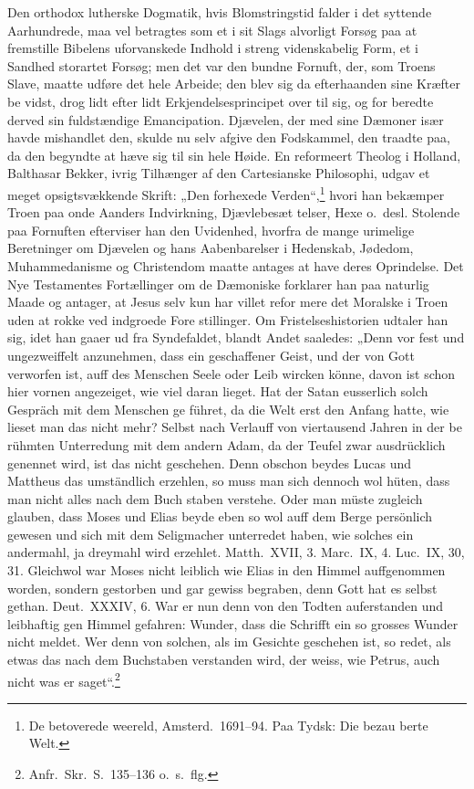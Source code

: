 \documentclass[12pt,a4paper]{article}
\newcommand{\opage}[1]{\marginnote{\footnotesize\textit{[#1]}}}
\begin{document}
Den orthodox lutherske Dogmatik, hvis Blomstringstid falder
i det syttende Aarhundrede, maa vel betragtes som et i sit Slags
alvorligt Forsøg paa at fremstille Bibelens uforvanskede Indhold
i streng videnskabelig Form, et i Sandhed storartet Forsøg; men
det var den bundne Fornuft, der, som Troens Slave, maatte udføre
det hele Arbeide; den blev sig da efterhaanden sine Kræfter be\-%
vidst, drog lidt efter lidt Erkjendelsesprincipet over til sig, og for\-%
beredte derved sin fuldstændige Emancipation. Djævelen, der med
sine Dæmoner især havde mishandlet den, skulde nu selv afgive
den Fodskammel, den traadte paa, da den begyndte at hæve sig
til sin hele Høide. En reformeert Theolog i Holland, Balthasar
Bekker, ivrig Tilhænger af den Cartesianske Philosophi, udgav et
meget opsigtsvækkende Skrift: „Den forhexede Verden“,\footnote{De betoverede weereld, Amsterd.\ 1691--94. Paa Tydsk: Die bezau\-%
berte Welt.} %
hvori
han bekæmper Troen paa onde Aanders Indvirkning, Djævlebesæt\-%
telser, Hexe o.\ desl. Stolende paa Fornuften efterviser han den
Uvidenhed, hvorfra de mange urimelige Beretninger om Djævelen
og hans Aabenbarelser i Hedenskab, Jødedom, Muhammedanisme
\opage{25}og Christendom maatte antages at have deres Oprindelse. Det
Nye Testamentes Fortællinger om de Dæmoniske forklarer han
paa naturlig Maade og antager, at Jesus selv kun har villet refor\-%
mere det Moralske i Troen uden at rokke ved indgroede Fore\-%
stillinger. Om Fristelseshistorien udtaler han sig, idet han gaaer
ud fra Syndefaldet, blandt Andet saaledes: „Denn vor fest und
ungezweiffelt anzunehmen, dass ein geschaffener Geist, und der von
Gott verworfen ist, auff des Menschen Seele oder Leib wircken
könne, davon ist schon hier vornen angezeiget, wie viel daran lieget.
Hat der Satan eusserlich solch Gespräch mit dem Menschen ge\-%
führet, da die Welt erst den Anfang hatte, wie lieset man das
nicht mehr? Selbst nach Verlauff von viertausend Jahren in der be\-%
rühmten Unterredung mit dem andern Adam, da der Teufel zwar
ausdrücklich genennet wird, ist das nicht geschehen. Denn obschon
beydes Lucas und Mattheus das umständlich erzehlen, so muss
man sich dennoch wol hüten, dass man nicht alles nach dem Buch\-%
staben verstehe. Oder man müste zugleich glauben, dass Moses
und Elias beyde eben so wol auff dem Berge persönlich gewesen
und sich mit dem Seligmacher unterredet haben, wie solches ein
andermahl, ja dreymahl wird erzehlet. Matth.\ XVII, 3. Marc.\ IX,
4. Luc.\ IX, 30, 31. Gleichwol war Moses nicht leiblich wie Elias
in den Himmel auffgenommen worden, sondern gestorben und gar
gewiss begraben, denn Gott hat es selbst gethan. Deut.\ XXXIV, 6.
War er nun denn von den Todten auferstanden und leibhaftig gen
Himmel gefahren: Wunder, dass die Schrifft ein so grosses Wunder
nicht meldet. Wer denn von solchen, als im Gesichte geschehen
ist, so redet, als etwas das nach dem Buchstaben verstanden wird,
der weiss, wie Petrus, auch nicht was er saget“.\footnote{Anfr.\ Skr.\ S.\ 135--136 o.\ s.\ flg.} %
\end{document}
